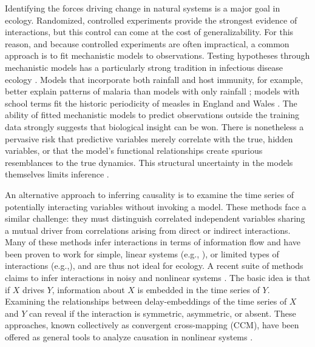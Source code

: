 \documentclass[10pt]{article}
\begin{document}
Identifying the forces driving change in natural systems is a major goal in ecology. 
Randomized, controlled experiments provide the strongest evidence of interactions, but this control can come at the cost of generalizability. 
For this reason, and because controlled experiments are often impractical, a common approach is to fit mechanistic models to observations. 
Testing hypotheses through mechanistic models has a particularly strong tradition in infectious disease ecology \cite{KeelingRohani, AndersonMay, Kermack1927, Ross1910}.
Models that incorporate both rainfall and host immunity, for example, better explain patterns of malaria than models with only rainfall \cite{Laneri2010}; models with school terms fit the historic periodicity of measles in England and Wales \cite{Finkenstadt2000, Fine1982}.
The ability of fitted mechanistic models to predict observations outside the training data strongly suggests that biological insight can be won. There is nonetheless a pervasive risk that predictive variables merely correlate with the true, hidden variables, or that the model's functional relationships create spurious resemblances to the true dynamics. 
This structural uncertainty in the models themselves limits inference \cite{BurnhamAnderson, He2009, Yodzis1988, Wood1999}. 

An alternative approach to inferring causality is to examine the time series of potentially interacting variables without invoking a model. 
These methods face a similar challenge: they must distinguish correlated independent variables sharing a mutual driver from correlations arising from direct or indirect interactions. 
Many of these methods infer interactions in terms of information flow and have been proven to work for simple, linear systems (e.g., \cite{Granger1969}), or limited types of interactions (e.g.,\cite{Schumacher2015,Mooij2014,Stegle2010}), and are thus not ideal for ecology.
A recent suite of methods claims to infer interactions in noisy and nonlinear systems \cite{Sugihara2012, Ye2015}. 
The basic idea is that if $X$ drives $Y$, information about $X$ is embedded in the time series of $Y$.
Examining the relationships between delay-embeddings of the time series of $X$ and $Y$ can reveal if the interaction is symmetric, asymmetric, or absent.
These approaches, known collectively as convergent cross-mapping (CCM), have been offered as general tools to analyze causation in nonlinear systems \cite{Sugihara2012, Ye2015}. 
\end{document}
